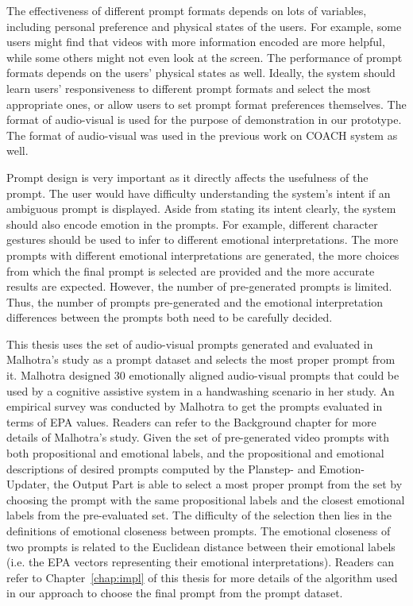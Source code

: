 The effectiveness of different prompt formats depends on lots of variables, including personal preference and physical states of the users. For example, some users might find that videos with more information encoded are more helpful, while some others might not even look at the screen. The performance of prompt formats depends on the users' physical states as well. Ideally, the system should learn users' responsiveness to different prompt formats and select the most appropriate ones, or allow users to set prompt format preferences themselves. The format of audio-visual is used for the purpose of demonstration in our prototype. The format of audio-visual was used in the previous work on COACH system as well.

Prompt design is very important as it directly affects the usefulness of the prompt. The user would have difficulty understanding the system's intent if an ambiguous prompt is displayed. Aside from stating its intent clearly, the system should also encode emotion in the prompts. For example, different character gestures should be used to infer to different emotional interpretations. The more prompts with different emotional interpretations are generated, the more choices from which the final prompt is selected are provided and the more accurate results are expected. However, the number of pre-generated prompts is limited. Thus, the number of prompts pre-generated and the emotional interpretation differences between the prompts both need to be carefully decided. 

This thesis uses the set of audio-visual prompts generated and evaluated in Malhotra's study \cite{malhotra2014} as a prompt dataset and selects the most proper prompt from it. Malhotra designed 30 emotionally aligned audio-visual prompts that could be used by a cognitive assistive system in a handwashing scenario in her study. An empirical survey was conducted by Malhotra to get the prompts evaluated in terms of EPA values. Readers can refer to the Background chapter for more details of Malhotra's study. Given the set of pre-generated video prompts with both propositional and emotional labels, and the propositional and emotional descriptions of desired prompts computed by the Planstep- and Emotion- Updater, the Output Part is able to select a most proper prompt from the set by choosing the prompt with the same propositional labels and the closest emotional labels from the pre-evaluated set. The difficulty of the selection then lies in the definitions of emotional closeness between prompts. The emotional closeness of two prompts is related to the Euclidean distance between their emotional labels (i.e. the EPA vectors representing their emotional interpretations). Readers can refer to Chapter~\ref{chap:impl} of this thesis for more details of the algorithm used in our approach to choose the final prompt from the prompt dataset.

